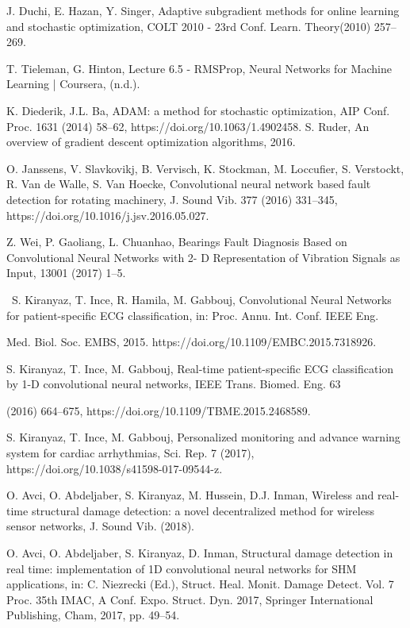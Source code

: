 \documentclass[15pt]{article}
\begin{document}
\begin{thebibliography}{99}
 J. Duchi, E. Hazan, Y. Singer, Adaptive subgradient methods for online learning and stochastic optimization, COLT 2010 - 23rd Conf. Learn. Theory(2010) 257–269.

 T. Tieleman, G. Hinton, Lecture 6.5 - RMSProp, Neural Networks for Machine Learning | Coursera, (n.d.).

 K. Diederik, J.L. Ba, ADAM: a method for stochastic optimization, AIP Conf. Proc. 1631 (2014) 58–62, https://doi.org/10.1063/1.4902458. S. Ruder, An overview of gradient descent optimization algorithms, 2016.

 O. Janssens, V. Slavkovikj, B. Vervisch, K. Stockman, M. Loccufier, S. Verstockt, R. Van de Walle, S. Van Hoecke, Convolutional neural network based fault detection for rotating machinery, J. Sound Vib. 377 (2016) 331–345, https://doi.org/10.1016/j.jsv.2016.05.027.

 Z. Wei, P. Gaoliang, L. Chuanhao, Bearings Fault Diagnosis Based on Convolutional Neural Networks with 2- D Representation of Vibration Signals as Input, 13001 (2017) 1–5.

 S. Kiranyaz, T. Ince, R. Hamila, M. Gabbouj, Convolutional Neural Networks for patient-specific ECG classification, in: Proc. Annu. Int. Conf. IEEE Eng.

Med. Biol. Soc. EMBS, 2015. https://doi.org/10.1109/EMBC.2015.7318926.

 S. Kiranyaz, T. Ince, M. Gabbouj, Real-time patient-specific ECG classification by 1-D convolutional neural networks, IEEE Trans. Biomed. Eng. 63

(2016) 664–675, https://doi.org/10.1109/TBME.2015.2468589.

 S. Kiranyaz, T. Ince, M. Gabbouj, Personalized monitoring and advance warning system for cardiac arrhythmias, Sci. Rep. 7 (2017), https://doi.org/10.1038/s41598-017-09544-z.

 O. Avci, O. Abdeljaber, S. Kiranyaz, M. Hussein, D.J. Inman, Wireless and real-time structural damage detection: a novel decentralized method for wireless sensor networks, J. Sound Vib. (2018).

 O. Avci, O. Abdeljaber, S. Kiranyaz, D. Inman, Structural damage detection in real time: implementation of 1D convolutional neural networks for SHM applications, in: C. Niezrecki (Ed.), Struct. Heal. Monit. Damage Detect. Vol. 7 Proc. 35th IMAC, A Conf. Expo. Struct. Dyn. 2017, Springer International Publishing, Cham, 2017, pp. 49–54.


\end{thebibliography}
\end{document}
